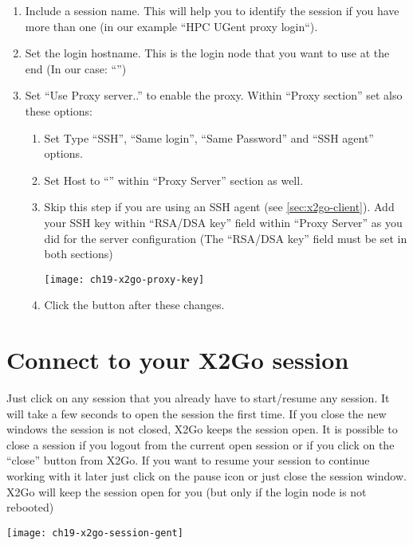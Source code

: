 \begin{enumerate}
    \item  Include a session name. This will help you to identify 
    the session if you have more than one (in our example ``HPC UGent proxy login``).
    \item  Set the login hostname. This is the login node that you want to use at the end
    (In our case: ``\strong{\emph{\loginhost{}}}'')
    \item  Set ``Use Proxy server..'' to enable the proxy.
    Within ``Proxy section'' set also these options:
    \begin{enumerate}
      \item  Set Type ``SSH'', ``Same login'', ``Same Password'' and ``SSH agent'' options.
      \item  Set Host to ``\strong{\emph{\loginnode}}'' within ``Proxy Server'' section as well.
      \item  Skip this step if you are using an SSH agent (see \autoref{sec:x2go-client}).
      Add your  SSH key within ``RSA/DSA key'' field within ``Proxy Server'' as you
      did for the server configuration (The ``RSA/DSA key'' field must be set in both sections)
      \begin{center}
       \texttt{[image: ch19-x2go-proxy-key]}
      \end{center}
      \item  Click the  button after these changes.
    \end{enumerate}
\end{enumerate}

\section{Connect to your X2Go session}
\label{sec:connect-x2go}
Just click on any session that you already have to start/resume any session. It will take a few seconds to open the session the first time.
If you close the new windows the session is not closed, X2Go keeps the session open. It is possible to close a session if you logout from the current open session or if you click on the ``close'' button from X2Go. If you want to resume your session to continue working with it later just click on the pause icon or just close the session window. X2Go will keep the session open for you (but only if the login node is not rebooted)

\begin{center}
\texttt{[image: ch19-x2go-session-gent]}
\end{center}

